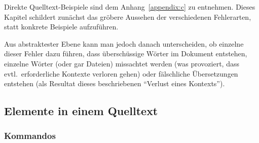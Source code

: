 Direkte Quelltext-Beispiele sind dem Anhang~\ref{appendix:c} zu entnehmen. Dieses Kapitel schildert zunächst das gröbere Aussehen der verschiedenen Fehlerarten, statt konkrete Beispiele aufzuführen. 

Aus abstraktester Ebene kann man jedoch danach unterscheiden, ob einzelne dieser Fehler dazu führen, dass überschüssige Wörter im Dokument entstehen, einzelne Wörter (oder gar Dateien) missachtet werden (was provoziert, dass evtl.\ erforderliche Kontexte verloren gehen) oder fälschliche Übersetzungen entstehen (als Resultat dieses beschriebenen \enquote{Verlust eines Kontexts}).







\subsection{Elemente in einem Quelltext}
\subsubsection{Kommandos}
